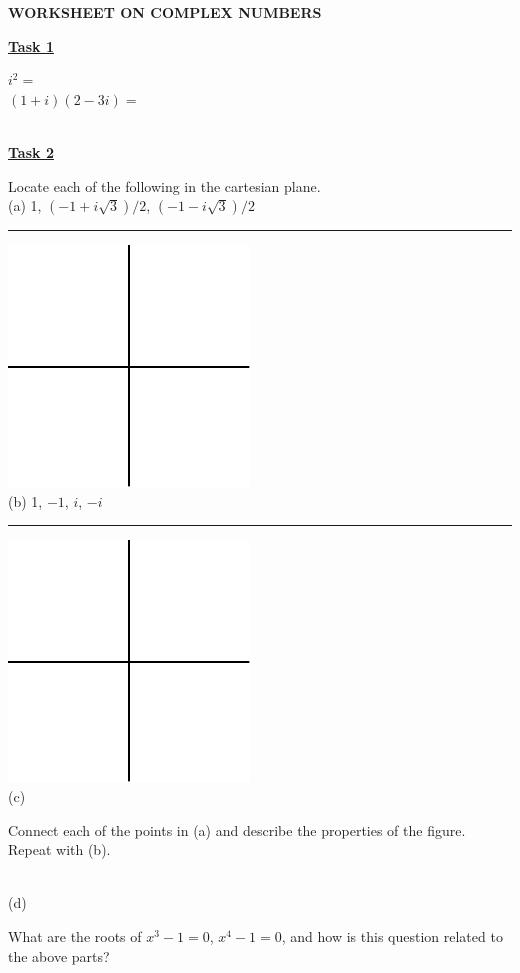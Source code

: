 \documentclass[12pt, fleqn, twoside]{book}
\makeatletter
\def\cleardoublepage{\clearpage\if@twoside \ifodd\c@page\else
   \hbox{}\thispagestyle{empty}\newpage\if@twocolumn\hbox{}\newpage\fi\fi\fi}
\makeatother
\begin{document}
%
%
\cleardoublepage
%
%
%
{\large \bf WORKSHEET ON COMPLEX NUMBERS }\\[.25in]
\rule{0in}{.25in}
\underline{\bf{Task 1}} \begin{minipage}[t]{3in}$i^2 =$\\[.25in]
$(1+i)(2-3i)=$
\end{minipage}\\[.75in]
\underline{\bf{Task 2}} \begin{minipage}[t]{6in}Locate each of the following in the cartesian plane.\\[.25in]
(a) 1, $(-1+i\sqrt3)/2$, $(-1-i\sqrt3)/2$\\ \rule{4in}{0in}\includegraphics{page_12.pdf}\\
(b) 1, $-1$, $i$, $-i$\\ \rule{3in}{0in}\includegraphics{page_12.pdf}\\
(c) \begin{minipage}[t]{5in}Connect each of the points in (a) and describe the properties of the figure.  Repeat with (b).\end{minipage}\\[1in]
(d) \begin{minipage}[t]{5in}What are the roots of $x^3-1=0$, $x^4-1=0$, and how is this question related to the above parts?\end{minipage}
\end{minipage}
\end{document}
